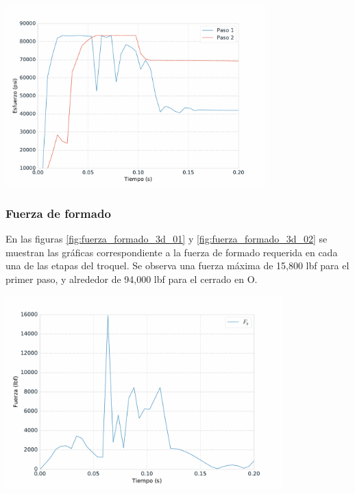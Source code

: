 \begin{center}
\includegraphics[width=0.75\textwidth]{src/ch4/von_mises_3d_all.pdf}
\label{fig:von_mises_3d_all}
\end{center}



\subsubsection{Fuerza de formado}

En las figuras \ref{fig:fuerza_formado_3d_01} y \ref{fig:fuerza_formado_3d_02} se muestran las gráficas 
correspondiente a la fuerza de formado requerida en cada una de las etapas del troquel. Se observa una 
fuerza máxima de 15,800 lbf para el primer paso, y alrededor de 94,000 lbf para el cerrado en O.\\

\begin{center}
\includegraphics[width=0.8\textwidth]{src/ch4/fuerza_formado_3d_01.pdf}
\label{fig:fuerza_formado_3d_01}
\end{center}

